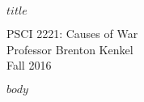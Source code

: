 \documentclass[12pt,svgnames]{article}
\begin{document}
{\Huge \textsf{\textbf{$title$}}}

\textsf{%
  PSCI 2221: Causes of War \\
  Professor Brenton Kenkel \\
  Fall 2016
}

\bigskip

$body$
\end{document}
